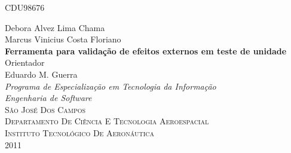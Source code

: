 \begin{titlepage}
	
\begin{flushright}
\textsc{\scriptsize CDU98676}\\[1cm]	
\end{flushright}

\begin{center}
	
\textnormal{\normalsize Debora Alvez Lima Chama\\Marcus Vinicius Costa Floriano}\\[2.5cm]

\textnormal{\large \bfseries Ferramenta para validação de efeitos externos em teste de unidade}\\[2.5cm]

\textnormal{\small Orientador}\\[0cm]
\textnormal{\small Eduardo M. Guerra}\\[2.5cm]
\textnormal{\large \emph{Programa de Especialização em Tecnologia da Informação}}\\[0cm]
\textnormal{\normalsize \emph{Engenharia de Software}}\\[2.5cm]

\textsc{\small São José Dos Campos}\\[0.2cm]
\textsc{\small Departamento De Ciência E Tecnologia Aeroespacial}\\[0.2cm]
\textsc{\small Instituto Tecnológico De Aeronáutica}\\[1cm]
\textnormal{\small 2011}\\[0cm]
\end{center}

\end{titlepage}

